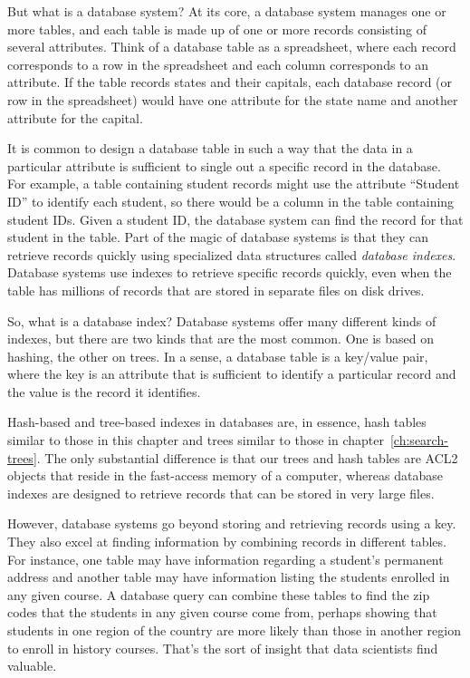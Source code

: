 But what is a database system? At its core, a database system
manages one or more tables, and each table is made up of one or more
records consisting of several attributes.
Think of a database table as a
spreadsheet, where each record corresponds to a row in the spreadsheet
and each column corresponds to an attribute. If the table
records states and their capitals, each database
record (or row in the spreadsheet) would have one attribute for the
state name and another attribute for the capital.

It is common to design a database table in such a way that the
data in a particular attribute is sufficient
to single out a specific record in the database.
For example, a table containing student records might use the attribute
``Student ID'' to identify each student, so there would be
a column in the table containing student IDs.
Given a student ID, the
database system can find the record for that student in the
table. Part of the magic of database systems is that they can retrieve
records quickly using specialized data
structures called \emph{database indexes}.
Database systems use indexes to retrieve specific records quickly,
even when the table has millions of records that are stored
in separate files on disk drives.

So, what is a database index? Database systems
offer many different kinds of indexes, but there are two kinds that are
the most common. One is based on hashing, the other on trees.
In a sense, a database
table is a key/value pair, where the key is an attribute that is
sufficient to identify a particular record and the value is the record
it identifies.

Hash-based and tree-based indexes
in databases are,
in essence, hash tables similar to those in this chapter
and trees similar to those in chapter~\ref{ch:search-trees}.
The only substantial difference
is that our trees and hash tables are ACL2 objects that
reside in the fast-access memory of a computer,
whereas database indexes are designed to retrieve records
that can be stored in very large files.

However, database systems go beyond storing and retrieving records
using a key. They also excel at finding information by combining
records in different tables. For instance, one table may have
information regarding a student's permanent address and another table
may have information listing the students enrolled in any given course.
A database query can combine these tables to find the zip codes that
the students in any given course come from, perhaps showing that students in one
region of the country are more likely than those in another region to
enroll in history courses. That's the sort of insight that
data scientists find valuable.

